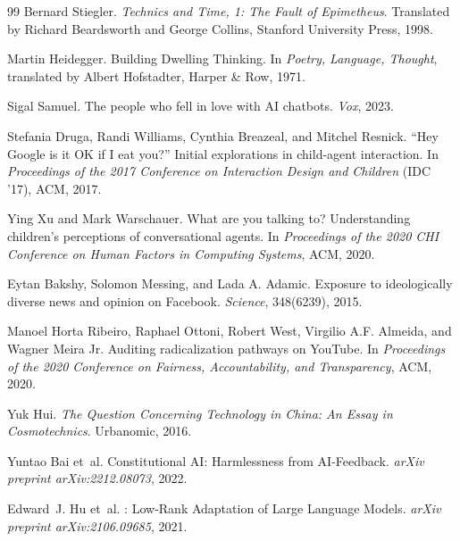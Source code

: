 \begin{thebibliography}{99}
Bernard Stiegler.
\newblock \emph{Technics and Time, 1: The Fault of Epimetheus}.
\newblock Translated by Richard Beardsworth and George Collins, Stanford University Press, 1998.

Martin Heidegger.
\newblock Building Dwelling Thinking.
\newblock In \emph{Poetry, Language, Thought}, translated by Albert Hofstadter, Harper \& Row, 1971.

Sigal Samuel.
\newblock The people who fell in love with AI chatbots.
\newblock \emph{Vox}, 2023.

Stefania Druga, Randi Williams, Cynthia Breazeal, and Mitchel Resnick.
\newblock ``Hey Google is it OK if I eat you?'' Initial explorations in child-agent interaction.
\newblock In \emph{Proceedings of the 2017 Conference on Interaction Design and Children} (IDC '17), ACM, 2017.

Ying Xu and Mark Warschauer.
\newblock What are you talking to? Understanding children's perceptions of conversational agents.
\newblock In \emph{Proceedings of the 2020 CHI Conference on Human Factors in Computing Systems}, ACM, 2020.

Eytan Bakshy, Solomon Messing, and Lada A. Adamic.
\newblock Exposure to ideologically diverse news and opinion on Facebook.
\newblock \emph{Science}, 348(6239), 2015.

Manoel Horta Ribeiro, Raphael Ottoni, Robert West, Virgilio A.F. Almeida, and Wagner Meira Jr.
\newblock Auditing radicalization pathways on YouTube.
\newblock In \emph{Proceedings of the 2020 Conference on Fairness, Accountability, and Transparency}, ACM, 2020.

Yuk Hui.
\newblock \emph{The Question Concerning Technology in China: An Essay in Cosmotechnics}.
\newblock Urbanomic, 2016.

Yuntao Bai et~al.
\newblock Constitutional {AI}: Harmlessness from {AI}-Feedback.
\newblock \emph{arXiv preprint arXiv:2212.08073}, 2022.

Edward~J. Hu et~al.
: Low-Rank Adaptation of Large Language Models.
\newblock \emph{arXiv preprint arXiv:2106.09685}, 2021.

\end{thebibliography}
